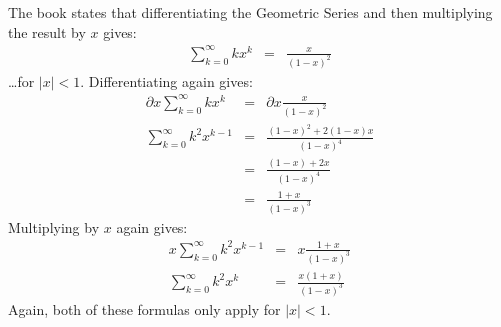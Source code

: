 The book states that differentiating the Geometric Series and then multiplying the result by $x$ gives:
\begin{eqnarray*}
	\sum_{k=0}^\infty k x^k & = & \frac{x}{\left ( 1-x \right )^2}
\end{eqnarray*}
\ldots for $\left | x \right | < 1$. Differentiating again gives:
\begin{eqnarray*}
	\partial x \sum_{k=0}^\infty k x^k & = & \partial x \frac{x}{\left ( 1-x \right )^2} \\
	\sum_{k=0}^\infty k^2 x^{k-1} & = & \frac{\left ( 1-x \right )^2 + 2\left ( 1-x \right )x}{\left ( 1-x \right )^4} \\
	& = & \frac{\left ( 1-x \right ) + 2x}{\left ( 1-x \right )^4} \\
	& = & \frac{1+x}{\left ( 1-x \right )^3}
\end{eqnarray*}
Multiplying by $x$ again gives:
\begin{eqnarray*}
	x \sum_{k=0}^\infty k^2 x^{k-1} & = & x \frac{1+x}{\left ( 1-x \right )^3} \\
	\sum_{k=0}^\infty k^2 x^k & = & \frac{x \left ( 1+x \right )}{\left ( 1-x \right )^3}
\end{eqnarray*}
Again, both of these formulas only apply for $\left | x \right | < 1$.
